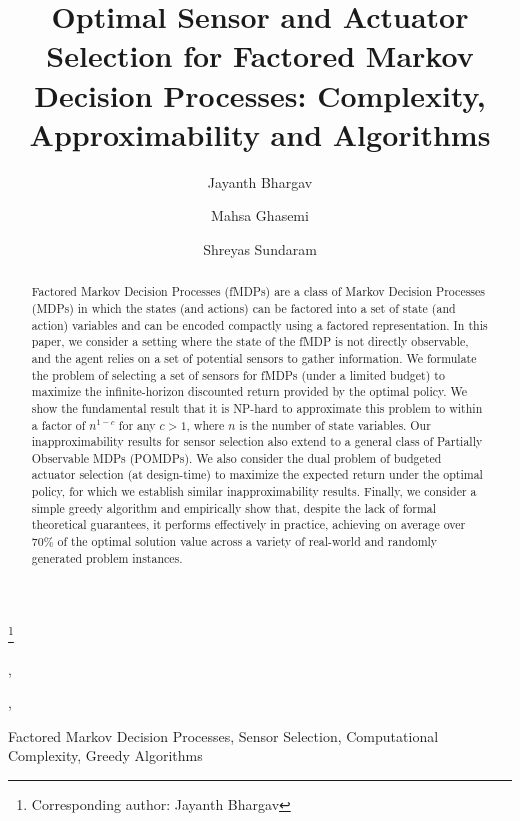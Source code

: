 \documentclass[twocolumn]{autart}    %
\begin{document}
\begin{frontmatter}

\title{Optimal Sensor and Actuator Selection for Factored Markov Decision Processes: Complexity, Approximability and Algorithms} %

\thanks[footnoteinfo]{ Corresponding author: Jayanth Bhargav}

\author[]{Jayanth Bhargav},    %
\author[]{Mahsa Ghasemi},               %
\author[]{Shreyas Sundaram}  %

\address{Elmore Family School of Electrical and Computer Engineering, Purdue University}  %
\begin{keyword}                           %
  Factored Markov Decision Processes, Sensor Selection, Computational Complexity, Greedy Algorithms             %
\end{keyword}                             %

\begin{abstract}
Factored Markov Decision Processes (fMDPs) are a class of Markov Decision Processes (MDPs) in which the states (and actions) can be factored into a set of state (and action) variables and can be encoded compactly using a factored representation. In this paper, we consider a setting where the state of the fMDP is not directly observable, and the agent relies on a set of potential sensors to gather information. We formulate the problem of selecting a set of sensors for fMDPs (under a limited budget) to maximize the infinite-horizon discounted return provided by the optimal policy. We show the fundamental result that it is NP-hard to approximate this problem to within a factor of $n^{1-c}$ for any $c > 1$, where $n$ is the number of state variables. Our inapproximability results for sensor selection also extend to a general class of Partially Observable MDPs (POMDPs). We also consider the dual problem of budgeted actuator selection (at design-time) to maximize the expected return under the optimal policy, for which we establish similar inapproximability results. {Finally, we consider a simple greedy algorithm and empirically show that, despite the lack of formal theoretical guarantees, it performs effectively in practice, achieving on average over \(70\%\) of the optimal solution value across a variety of real-world and randomly generated problem instances.}

\end{abstract}

\end{frontmatter}
\end{document}
